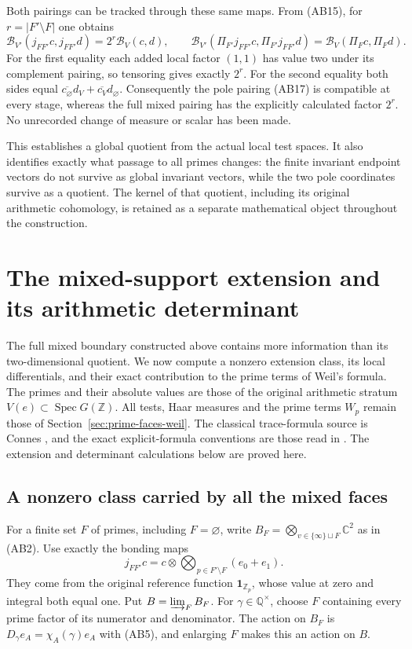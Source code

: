\documentclass[11pt,a4paper]{article}
\theoremstyle{definition}\newtheorem{definition}[theorem]{Definition}
\newcommand{\Z}{\mathbb Z}\newcommand{\Q}{\mathbb Q}
\newcommand{\C}{\mathbb C}\newcommand{\R}{\mathbb R}
\newcommand{\Spec}{\operatorname{Spec}}\newcommand{\SpecMon}{\operatorname{Spec}_{\mathrm{mon}}}
\begin{document}
Both pairings can be tracked through these same maps. From (AB15),
for $r=|F'\setminus F|$ one obtains
\[
 \mathscr B_{V'}(j_{FF'}c,j_{FF'}d)=2^r\mathscr B_V(c,d),
 \qquad
 \mathscr B_{V'}(\Pi_{F'}j_{FF'}c,\Pi_{F'}j_{FF'}d)
 =\mathscr B_V(\Pi_Fc,\Pi_Fd).
 \tag{AB24}
\]
For the first equality each added local factor $(1,1)$ has value two
under its complement pairing, so tensoring gives exactly $2^r$.
For the second equality both sides equal
$\overline{c_\varnothing}d_V+\overline{c_V}d_\varnothing$.
Consequently the pole pairing (AB17) is compatible at every stage,
whereas the full mixed pairing has the explicitly calculated factor
$2^r$. No unrecorded change of measure or scalar has been made.

This establishes a global quotient from the actual local test spaces.
It also identifies exactly what passage to all primes changes: the
finite invariant endpoint vectors do not survive as global invariant
vectors, while the two pole coordinates survive as a quotient. The
kernel of that quotient, including its original arithmetic cohomology,
is retained as a separate mathematical object throughout the construction.

\section{The mixed-support extension and its arithmetic determinant}
\label{sec:mixed-extension-trace}
The full mixed boundary constructed above contains more information than its
two-dimensional quotient. We now compute a nonzero extension class, its local
differentials, and their exact contribution to the prime terms of Weil's
formula. The primes and their absolute values are those of the original
arithmetic stratum $V(e)\subset\Spec G(\Z)$. All tests, Haar measures and
the prime terms $W_p$ remain those of Section~\ref{sec:prime-faces-weil}.
The classical trace-formula source is Connes
\cite[Section III and Section V]{Connes1998}, and the exact explicit-formula
conventions are those read in \cite[\texttt{wp}, \texttt{arch}]{Connes2026}.
The extension and determinant calculations below are proved here.

\subsection{A nonzero class carried by all the mixed faces}
For a finite set $F$ of primes, including $F=\varnothing$, write
$B_F=\bigotimes_{v\in\{\infty\}\sqcup F}\C^2$ as in (AB2).
Use exactly the bonding maps
\[
 j_{FF'}c=c\otimes\bigotimes_{p\in F'\setminus F}(e_0+e_1).
 \tag{ME1}
\]
They come from the original reference function $\mathbf1_{\Z_p}$,
whose value at zero and integral both equal one. Put
$B=\varinjlim_F B_F$. For $\gamma\in\Q^\times$, choose $F$ containing
every prime factor of its numerator and denominator. The action on $B_F$ is
$D_\gamma e_A=\chi_A(\gamma)e_A$ with (AB5), and enlarging $F$ makes
this an action on $B$.
\end{document}
